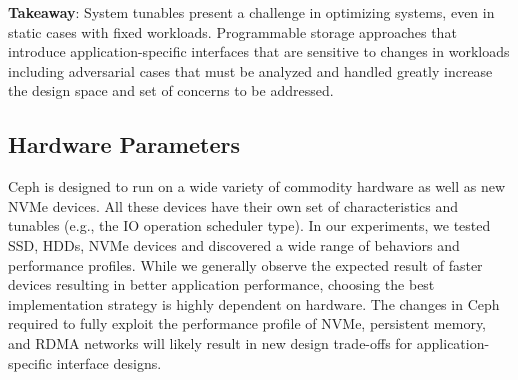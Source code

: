 
\textbf{Takeaway}: System tunables present a challenge in optimizing systems,
even in static cases with fixed workloads. Programmable storage approaches
that introduce application-specific interfaces that are sensitive to changes
in workloads including adversarial cases that must be analyzed and handled
greatly increase the design space and set of concerns to be addressed.

\subsection{Hardware Parameters}

Ceph is designed to run on a wide variety of commodity hardware as well as new
NVMe devices. All these devices have their own set of characteristics and
tunables (e.g., the IO operation scheduler type). In our experiments, we tested
SSD, HDDs, NVMe devices and discovered a wide range of behaviors and
performance profiles. While we generally observe the expected result of faster
devices resulting in better application performance, choosing the best
implementation strategy is highly dependent on hardware. The changes in Ceph
required to fully exploit the performance profile of NVMe, persistent
memory, and RDMA networks will likely result in new design trade-offs for
application-specific interface designs.
